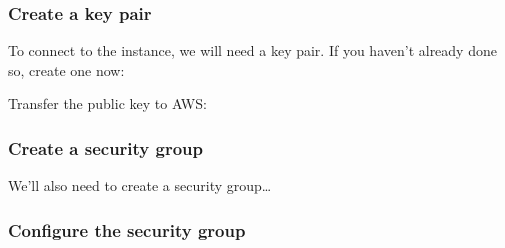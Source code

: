 \subsubsection{Create a key pair}\label{create-a-key-pair-1}

To connect to the instance, we will need a key pair. If you haven't
already done so, create one now:

\begin{Shaded}
\begin{Highlighting}[]
\NormalTok{$ } 
\end{Highlighting}
\end{Shaded}

Transfer the public key to AWS:

\begin{Shaded}
\begin{Highlighting}[]
\NormalTok{$ } \KeywordTok{<}\KeywordTok{>} \NormalTok{\textbackslash{}}
   \KeywordTok{<}\KeywordTok{>}
\end{Highlighting}
\end{Shaded}

\subsubsection{Create a security group}\label{create-a-security-group}

We'll also need to create a security group\ldots{}

\begin{Shaded}
\begin{Highlighting}[]
\NormalTok{$ } 
    \NormalTok{\textbackslash{}}
   
\end{Highlighting}
\end{Shaded}

\subsubsection{Configure the security
group}\label{configure-the-security-group}

